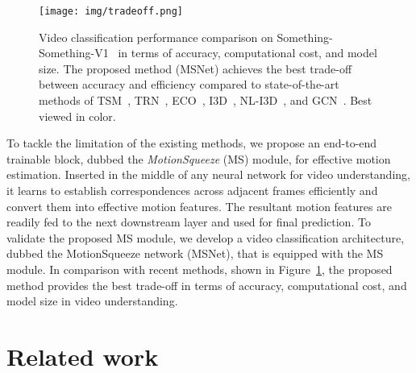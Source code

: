 \documentclass[runningheads]{llncs}
\begin{document}
\begin{figure}[t]
\centering
\texttt{[image: img/tradeoff.png]}
   \caption{
   Video classification performance comparison on Something-Something-V1~\cite{goyal2017something} in terms of accuracy, computational cost, and model size. The proposed method (MSNet) achieves the best trade-off between accuracy and efficiency compared to state-of-the-art methods of TSM~\cite{lin2019tsm}, TRN~\cite{zhou2018temporal}, ECO~\cite{zolfaghari2018eco}, I3D~\cite{carreira2017quo}, NL-I3D~\cite{wang2018non}, and GCN~\cite{wang2018videos}. Best viewed in color. 
   }
\label{fig:1}
\end{figure}

To tackle the limitation of the existing methods, we propose an end-to-end trainable block, dubbed the {\em MotionSqueeze} (MS) module, for effective motion estimation.
Inserted in the middle of any neural network for video understanding, it learns to establish correspondences across adjacent frames efficiently and convert them into effective motion features. The resultant motion features are readily fed to the next downstream layer and used for final prediction.   
To validate the proposed MS module, we develop a video classification architecture, dubbed the MotionSqueeze network (MSNet), that is equipped with the MS module. 
In comparison with recent methods, shown in Figure~\ref{fig:1}, the proposed method provides the best trade-off in terms of accuracy, computational cost, and model size in video understanding.



 


\section{Related work}
\end{document}
